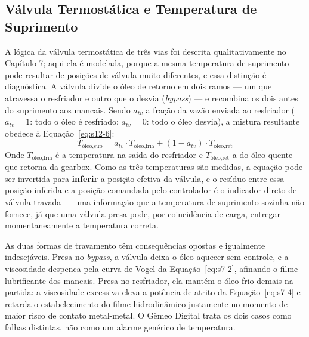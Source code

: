 \documentclass[12pt,a4paper]{article}
\numberwithin{equation}{section}
\numberwithin{table}{section}
\numberwithin{figure}{section}
\begin{document}
{	\subsection{\textbf{Válvula Termostática e Temperatura de Suprimento}}
	A lógica da válvula termostática de três vias foi descrita qualitativamente no Capítulo 7; aqui ela é modelada, porque a mesma temperatura de suprimento pode resultar de posições de válvula muito diferentes, e essa distinção é diagnóstica. A válvula divide o óleo de retorno em dois ramos — um que atravessa o resfriador e outro que o desvia (\textit{bypass}) — e recombina os dois antes do suprimento aos mancais. Sendo $a_{tv}$ a fração da vazão enviada ao resfriador ($a_{tv}=1$: todo o óleo é resfriado; $a_{tv}=0$: todo o óleo desvia), a mistura resultante obedece à Equação~\eqref{eq:s12-6}:
	\begin{equation}\label{eq:s12-6}
	T_{\text{óleo,sup}} = a_{tv} \cdot T_{\text{óleo,fria}} + (1 - a_{tv}) \cdot T_{\text{óleo,ret}}
	\end{equation}
	Onde $T_{\text{óleo,fria}}$ é a temperatura na saída do resfriador e $T_{\text{óleo,ret}}$ a do óleo quente que retorna da gearbox. Como as três temperaturas são medidas, a equação pode ser invertida para \textbf{inferir} a posição efetiva da válvula, e o resíduo entre essa posição inferida e a posição comandada pelo controlador é o indicador direto de válvula travada — uma informação que a temperatura de suprimento sozinha não fornece, já que uma válvula presa pode, por coincidência de carga, entregar momentaneamente a temperatura correta.

	As duas formas de travamento têm consequências opostas e igualmente indesejáveis. Presa no \textit{bypass}, a válvula deixa o óleo aquecer sem controle, e a viscosidade despenca pela curva de Vogel da Equação~\eqref{eq:s7-2}, afinando o filme lubrificante dos mancais. Presa no resfriador, ela mantém o óleo frio demais na partida: a viscosidade excessiva eleva a potência de atrito da Equação~\eqref{eq:s7-4} e retarda o estabelecimento do filme hidrodinâmico justamente no momento de maior risco de contato metal-metal. O Gêmeo Digital trata os dois casos como falhas distintas, não como um alarme genérico de temperatura.

}
\end{document}

